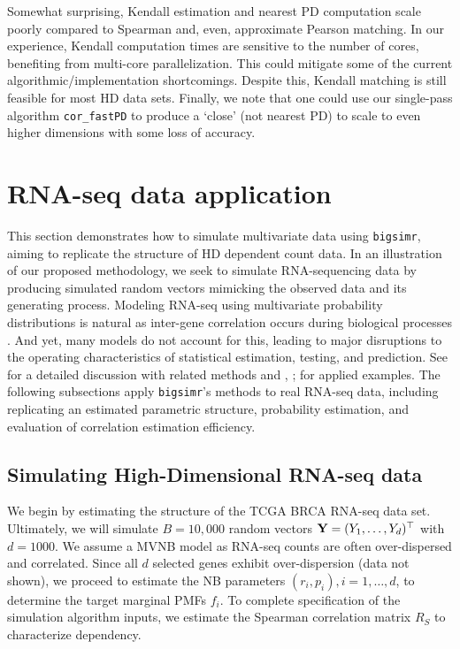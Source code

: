 \documentclass[
]{jss}
\begin{document}
Somewhat surprising, Kendall estimation and nearest PD computation scale
poorly compared to Spearman and, even, approximate Pearson matching. In
our experience, Kendall computation times are sensitive to the number of
cores, benefiting from multi-core parallelization. This could mitigate
some of the current algorithmic/implementation shortcomings. Despite
this, Kendall matching is still feasible for most HD data sets. Finally,
we note that one could use our single-pass algorithm
\texttt{cor\_fastPD} to produce a `close' (not nearest PD) to scale to
even higher dimensions with some loss of accuracy.

\hypertarget{examples}{%
\section{RNA-seq data application}\label{examples}}

This section demonstrates how to simulate multivariate data using
\texttt{bigsimr}, aiming to replicate the structure of HD dependent
count data. In an illustration of our proposed methodology, we seek to
simulate RNA-sequencing data by producing simulated random vectors
mimicking the observed data and its generating process. Modeling RNA-seq
using multivariate probability distributions is natural as inter-gene
correlation occurs during biological processes \citep{Wang2009b}. And
yet, many models do not account for this, leading to major disruptions
to the operating characteristics of statistical estimation, testing, and
prediction. See \citet{Efron2012} for a detailed discussion with related
methods and \citet{Wu2012b}, \citet{Schissler2018};
\citet{Schissler2019} for applied examples. The following subsections
apply \texttt{bigsimr}'s methods to real RNA-seq data, including
replicating an estimated parametric structure, probability estimation,
and evaluation of correlation estimation efficiency.

\hypertarget{simulating-high-dimensional-rna-seq-data}{%
\subsection{Simulating High-Dimensional RNA-seq
data}\label{simulating-high-dimensional-rna-seq-data}}

We begin by estimating the structure of the TCGA BRCA RNA-seq data set.
Ultimately, we will simulate \(B=10,000\) random vectors
\({\bf Y}=(Y_1, \ldots, Y_d)^\top\) with \(d=1000\). We assume a MVNB
model as RNA-seq counts are often over-dispersed and correlated. Since
all \(d\) selected genes exhibit over-dispersion (data not shown), we
proceed to estimate the NB parameters \((r_i, p_i), i=1,\ldots,d\), to
determine the target marginal PMFs \(f_i\). To complete specification of
the simulation algorithm inputs, we estimate the Spearman correlation
matrix \(R_S\) to characterize dependency.
\end{document}
